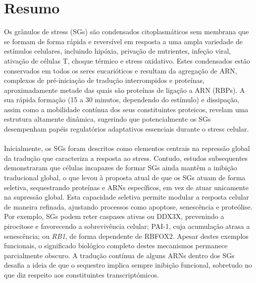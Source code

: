 \chapter*{Resumo}

 Os grânulos de stress (SGs) são condensados citoplasmáticos sem membrana\cite{shin_liquid_2017} que se formam de forma rápida e reversível em resposta a uma ampla variedade de estímulos celulares, incluindo hipóxia, privação de nutrientes, infeção viral, ativação de células T, choque térmico e stress oxidativo\cite{anderson_stress_2015, anderson_stress_2009, mccormick_translation_2017, wallace_reversible_2015, curdy_proteome_2023, paget_stress_2023}. Estes condensados estão conservados em todos os seres eucarióticos e resultam da agregação de ARN, complexos de pré-iniciação de tradução interrompidos e proteínas\cite{anderson_stress_2009}, aproximadamente metade das quais são proteínas de ligação a ARN (RBPs)\cite{nunes_msgp_2019}. A sua rápida formação (15 a 30 minutos, dependendo do estímulo) e dissipação\cite{hofmann_translation_2012}, assim como a mobilidade contínua dos seus constituintes proteicos, revelam uma estrutura altamente dinâmica, sugerindo que potencialmente os SGs desempenham papéis regulatórios adaptativos essenciais durante o stress celular\cite{ivanov_stress_2019}.
 \\
 \\
 Inicialmente, os SGs foram descritos como elementos centrais na repressão global da tradução que caracteriza a resposta ao stress\cite{kedersha_rna-binding_1999}. Contudo, estudos subsequentes demonstraram que células incapazes de formar SGs ainda mantêm a inibição traducional global\cite{kedersha_g3bpcaprin1usp10_2016}, o que levou à proposta atual de que os SGs atuam de forma seletiva, sequestrando proteínas e ARNs específicos, em vez de atuar unicamente na supressão global\cite{marcelo_stress_2021}. Esta capacidade seletiva permite modular a resposta celular de maneira refinada, ajustando processos como apoptose, senescência e proteólise. Por exemplo, SGs podem reter caspases ativas ou DDX3X, prevenindo a pirocitose e favorecendo a sobrevivência celular\cite{arimoto_formation_2008, tsai_rhoarock1_2010, fujikawa_stress_2023}; PAI-1, cuja acumulação atrasa a senescência\cite{omer_stress_2018}; ou \textit{RB1}, de forma dependente de RBFOX2\cite{park_stress_2017}. Apesar destes exemplos funcionais, o significado biológico completo destes mecanismos permanece parcialmente obscuro. A tradução contínua de alguns ARNs dentro dos SGs desafia a ideia de que o sequestro implica sempre inibição funcional, sobretudo no que diz respeito aos constituintes transcriptómicos\cite{mateju_single-molecule_2020}.
